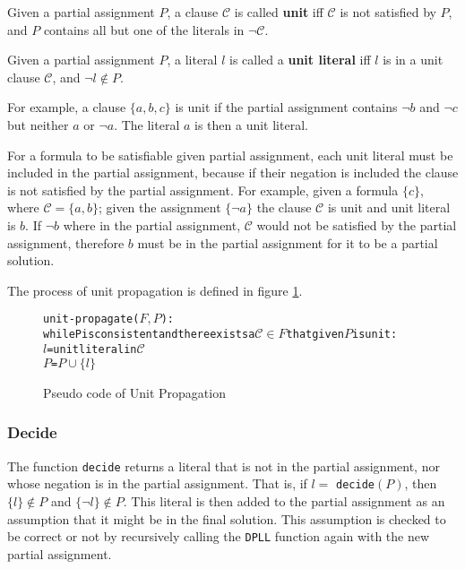 \begin{defs}
Given a partial assignment $P$, a clause $\mathcal{C}$ is called \textbf{unit} iff $\mathcal{C}$ is not satisfied by $P$, and $P$ contains all but one of the literals in $\neg \mathcal{C}$.
\end{defs}

\begin{defs}
Given a partial assignment $P$, a literal $l$ is called a \textbf{unit literal} iff $l$ is in a unit clause $\mathcal{C}$, and $\neg l \not \in P$.  
\end{defs}

For example, a clause $\{a,b,c\}$ is unit if the partial assignment contains $\neg b$ and $\neg c$ but neither $a$ or $\neg a$.
The literal $a$ is then a unit literal.

For a formula to be satisfiable given partial assignment, each unit literal must be included in the partial assignment,
because if their negation is included the clause is not satisfied by the partial assignment.
For example, given a formula $\{c\}$, where $\mathcal{C} = \{a,b\}$;
given the assignment $\{\neg a\}$ the clause $\mathcal{C}$ is unit and unit literal is $b$.
If $\neg b$ where in the partial assignment, $\mathcal{C}$ would not be satisfied by the partial assignment,
therefore $b$ must be in the partial assignment for it to be a partial solution.

The process of unit propagation is defined in figure \ref{impl.propagation}.
\begin{figure}[htp]
\begin{center}
\begin{alltt}
unit-propagate(\(F, P\)):
  while P is consistent and there exists a \(\mathcal{C} \in F\) that given \(P\) is unit:
    \(l\) = unit literal in \(\mathcal{C}\)
    \(P\) = \(P \cup \{l\}\)
\end{alltt}
  \caption{Pseudo code of Unit Propagation}
  \label{impl.propagation}
\end{center}
\end{figure}

\subsubsection{Decide}
\label{impl.litorder}
The function \verb+decide+ returns a literal that is not in the partial assignment, nor whose negation is in the partial assignment.
That is, if $l =$ \verb+decide+$(P)$, then $\{l\} \not \in P$ and $\{\neg l\} \not \in P$.
This literal is then added to the partial assignment as an assumption that it might be in the final solution.
This assumption is checked to be correct or not by recursively calling the \texttt{DPLL} function again with the new partial assignment.

